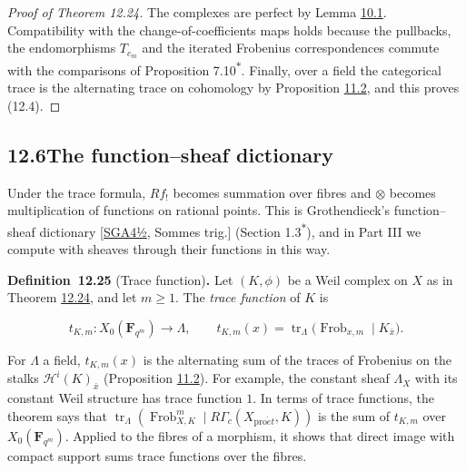 \documentclass[11pt]{article}
\newenvironment{bpstatement}[2]{\par\addvspace{0.6\baselineskip}\noindent\textbf{#1}#2\textbf{.}\enspace\ignorespaces}
  {\par\addvspace{0.4\baselineskip}}
\newcommand{\bpout}[1]{#1\textsuperscript{\hyperlink{bp-outside}{\ensuremath{\ast}}}}
\begin{document}
\begin{proof}[{Proof of Theorem 12.24}]
The complexes are perfect by Lemma \hyperref[bp105]{10.1}. Compatibility with the change-of-coefficients maps holds because the pullbacks, the endomorphisms \(T_{c_m}\) and the iterated Frobenius correspondences commute with the comparisons of Proposition \bpout{7.10}. Finally, over a field the categorical trace is the alternating trace on cohomology by Proposition \hyperref[bp176]{11.2}, and this proves (12.4).
\end{proof}


\subsection*{\texorpdfstring{12.6\quad The function–sheaf dictionary}{12.6 The function–sheaf dictionary}}
\label{bp301}%
\label{bp302}%
Under the trace formula, \(Rf_!\) becomes summation over fibres and \(\otimes\) becomes multiplication of functions on rational points. This is Grothendieck's function–sheaf dictionary [\hyperref[bp331]{SGA4½}, Sommes trig.] (Section \bpout{1.3}), and in Part III we compute with sheaves through their functions in this way.

\label{bp303}%
\begin{bpstatement}{Definition~12.25}{ (Trace function)}
Let \((K,\phi)\) be a Weil complex on \(X\) as in Theorem \hyperref[bp298]{12.24}, and let \(m\geq1\). The \emph{trace function} of \(K\) is

\[
t_{K,m}:X_0(\mathbf F_{q^m})\longrightarrow\Lambda,\qquad
t_{K,m}(x)=\operatorname{tr}_\Lambda\bigl(\operatorname{Frob}_{x,m}
\mid K_{\bar x}\bigr).
\]
\end{bpstatement}

\label{bp304}%
For \(\Lambda\) a field, \(t_{K,m}(x)\) is the alternating sum of the traces of Frobenius on the stalks \(\mathcal H^i(K)_{\bar x}\) (Proposition \hyperref[bp176]{11.2}). For example, the constant sheaf \(\Lambda_X\) with its constant Weil structure has trace function \(1\). In terms of trace functions, the theorem says that \(\operatorname{tr}_\Lambda(\operatorname{Frob}_{X,K}^m
\mid R\Gamma_c(X_{\mathrm{pro}\acute{e}t},K))\) is the sum of \(t_{K,m}\) over \(X_0(\mathbf F_{q^m})\). Applied to the fibres of a morphism, it shows that direct image with compact support sums trace functions over the fibres.
\end{document}
